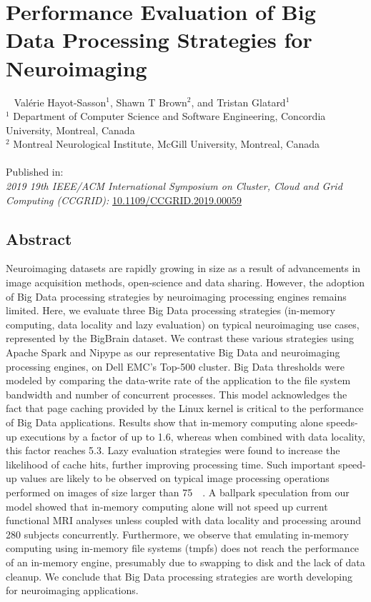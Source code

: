 \chapter{Performance Evaluation of Big Data Processing Strategies for
Neuroimaging}~\label{chp:bigdatastrategies} Val\'erie Hayot-Sasson$^{1}$, Shawn
T Brown$^{2}$, and Tristan Glatard$^{1}$ \\
\begingroup \footnotesize $^1$ Department of Computer Science and Software
Engineering, Concordia University, Montreal, Canada \\
$^2$ Montreal Neurological Institute, McGill University, Montreal, Canada \\
\endgroup 
\vspace{5pt} \\
Published in: \\
\hspace*{10pt} \textit{2019 19th IEEE/ACM International Symposium on Cluster,
Cloud and Grid Computing (CCGRID):} \url{10.1109/CCGRID.2019.00059}
\section{Abstract}
    Neuroimaging datasets are rapidly growing in size as a result of
    advancements in image acquisition methods, open-science and data sharing.
    However, the adoption of Big Data processing strategies by neuroimaging
    processing engines remains limited. Here, we evaluate three Big Data
    processing strategies (in-memory computing, data locality and lazy
    evaluation) on typical neuroimaging use cases, represented by the BigBrain
    dataset. We contrast these various strategies using Apache Spark and Nipype
    as our representative Big Data and neuroimaging processing engines, on Dell
    EMC's Top-500 cluster. Big Data thresholds were modeled by comparing the
    data-write rate of the application to the file system bandwidth and number of
    concurrent processes. This model acknowledges the fact that page caching
    provided by the Linux kernel is critical to the performance of Big Data
    applications. Results show that in-memory computing alone speeds-up
    executions by a factor of up to 1.6, whereas when combined with data
    locality, this factor reaches 5.3. Lazy evaluation strategies were found to
    increase the likelihood of cache hits, further improving processing time.
    Such important speed-up values are likely to be observed on typical image
    processing operations performed on images of size larger than \SI{75}{\giga\byte}. A
    ballpark speculation from our model showed that in-memory computing alone
    will not speed up current functional MRI analyses unless coupled with data
    locality and processing around 280 subjects concurrently. Furthermore, we
    observe that emulating in-memory computing using in-memory file systems
    (tmpfs) does not reach the performance of an in-memory engine, presumably
    due to swapping to disk and the lack of data cleanup. We conclude that Big
    Data processing strategies are worth developing for neuroimaging
    applications. 

